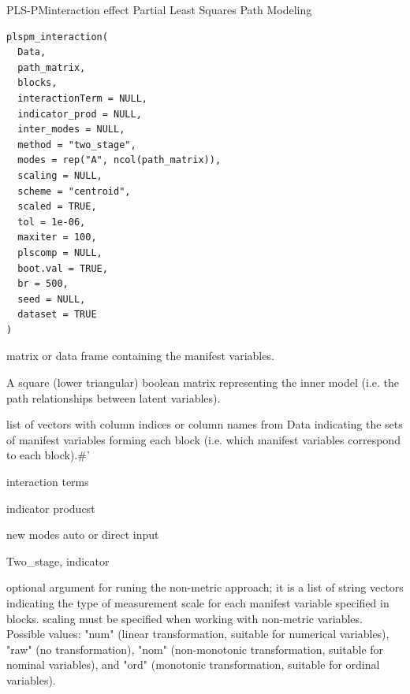 \documentclass[a4paper]{book}
\begin{document}
%
\begin{Description}
PLS-PMinteraction effect  Partial Least Squares Path Modeling
\end{Description}
%
\begin{Usage}
\begin{verbatim}
plspm_interaction(
  Data,
  path_matrix,
  blocks,
  interactionTerm = NULL,
  indicator_prod = NULL,
  inter_modes = NULL,
  method = "two_stage",
  modes = rep("A", ncol(path_matrix)),
  scaling = NULL,
  scheme = "centroid",
  scaled = TRUE,
  tol = 1e-06,
  maxiter = 100,
  plscomp = NULL,
  boot.val = TRUE,
  br = 500,
  seed = NULL,
  dataset = TRUE
)
\end{verbatim}
\end{Usage}
%
\begin{Arguments}
\begin{ldescription}
\item[\code{Data}] matrix or data frame containing the manifest variables.

\item[\code{path\_matrix}] A square (lower triangular) boolean matrix
representing the inner model (i.e. the path relationships between latent variables).

\item[\code{blocks}] list of vectors with column indices
or column names from Data indicating the sets of
manifest variables forming each block (i.e.
which manifest variables correspond to each block).\#'

\item[\code{interactionTerm}] interaction terms

\item[\code{indicator\_prod}] indicator producst

\item[\code{inter\_modes}] new modes auto or direct input

\item[\code{method}] Two\_stage, indicator

\item[\code{modes}] optional argument for runing the non-metric approach;
it is a list of string vectors indicating the type of measurement
scale for each manifest variable specified in blocks. scaling must be
specified when working with non-metric variables. Possible values:
"num" (linear transformation, suitable for numerical variables),
"raw" (no transformation), "nom" (non-monotonic transformation,
suitable for nominal variables), and "ord" (monotonic transformation,
suitable for ordinal variables).


\end{ldescription}
\end{Arguments}
\end{document}
